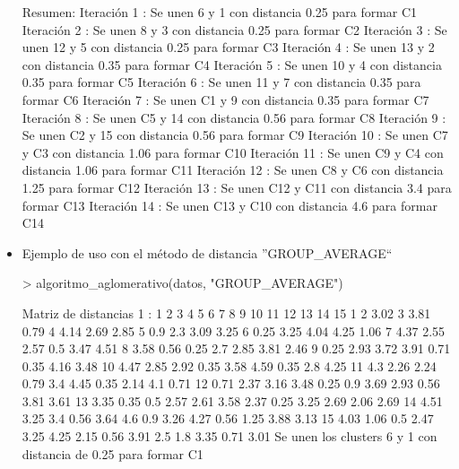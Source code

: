 \documentclass[a4paper, 12pt]{article}
\begin{document}
\begin{itemize}
\begin{Schunk}
\begin{Soutput}
Resumen:
Iteración 1 : Se unen 6 y 1 con distancia 0.25 para formar C1 
Iteración 2 : Se unen 8 y 3 con distancia 0.25 para formar C2 
Iteración 3 : Se unen 12 y 5 con distancia 0.25 para formar C3 
Iteración 4 : Se unen 13 y 2 con distancia 0.35 para formar C4 
Iteración 5 : Se unen 10 y 4 con distancia 0.35 para formar C5 
Iteración 6 : Se unen 11 y 7 con distancia 0.35 para formar C6 
Iteración 7 : Se unen C1 y 9 con distancia 0.35 para formar C7 
Iteración 8 : Se unen C5 y 14 con distancia 0.56 para formar C8 
Iteración 9 : Se unen C2 y 15 con distancia 0.56 para formar C9 
Iteración 10 : Se unen C7 y C3 con distancia 1.06 para formar C10 
Iteración 11 : Se unen C9 y C4 con distancia 1.06 para formar C11 
Iteración 12 : Se unen C8 y C6 con distancia 1.25 para formar C12 
Iteración 13 : Se unen C12 y C11 con distancia 3.4 para formar C13 
Iteración 14 : Se unen C13 y C10 con distancia 4.6 para formar C14 
\end{Soutput}
\end{Schunk}
		\item Ejemplo de uso con el método de distancia ''GROUP\_AVERAGE``
\begin{Schunk}
\begin{Sinput}
> algoritmo_aglomerativo(datos, "GROUP_AVERAGE")
\end{Sinput}
\begin{Soutput}
Matriz de distancias 1 :
   1    2    3    4    5    6    7    8    9    10   11   12   13   14   15
1                                                                          
2  3.02                                                                    
3  3.81 0.79                                                               
4  4.14 2.69 2.85                                                          
5  0.9  2.3  3.09 3.25                                                     
6  0.25 3.25 4.04 4.25 1.06                                                
7  4.37 2.55 2.57 0.5  3.47 4.51                                           
8  3.58 0.56 0.25 2.7  2.85 3.81 2.46                                      
9  0.25 2.93 3.72 3.91 0.71 0.35 4.16 3.48                                 
10 4.47 2.85 2.92 0.35 3.58 4.59 0.35 2.8  4.25                            
11 4.3  2.26 2.24 0.79 3.4  4.45 0.35 2.14 4.1  0.71                       
12 0.71 2.37 3.16 3.48 0.25 0.9  3.69 2.93 0.56 3.81 3.61                  
13 3.35 0.35 0.5  2.57 2.61 3.58 2.37 0.25 3.25 2.69 2.06 2.69             
14 4.51 3.25 3.4  0.56 3.64 4.6  0.9  3.26 4.27 0.56 1.25 3.88 3.13        
15 4.03 1.06 0.5  2.47 3.25 4.25 2.15 0.56 3.91 2.5  1.8  3.35 0.71 3.01   
Se unen los clusters 6 y 1 con distancia de 0.25 para formar C1 


\end{Soutput}
\end{Schunk}
\end{itemize}
\end{document}
